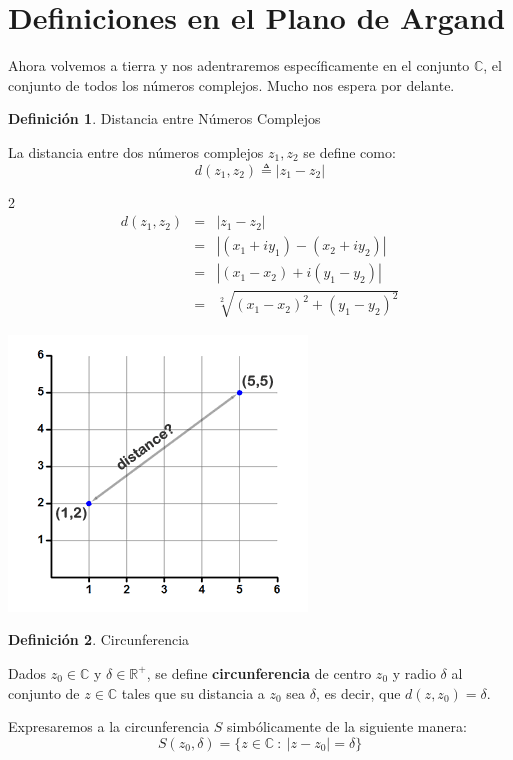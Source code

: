 \documentclass[12pt]{article}
\theoremstyle{definition}
\newtheorem{definition}{Definici\'on}[section]
\begin{document}
\section{Definiciones en el Plano de Argand}
Ahora volvemos a tierra y nos adentraremos espec\'ificamente en el conjunto $\mathbb{C}$, el conjunto de todos los n\'umeros complejos. Mucho nos espera por delante.\\

\colorbox{red!40!white!80}{\parbox{\linewidth}{
\theoremstyle{definition}
\begin{definition} Distancia entre N\'umeros Complejos

La distancia entre dos n\'umeros complejos $z_1, z_2$ se define como:
$$d(z_1, z_2) \triangleq |z_1 - z_2|$$
\end{definition}}}

\begin{multicols} {2}
\begin{eqnarray*}
d(z_1, z_2) &=& |z_1 - z_2|\\
&=& |(x_1 + iy_1) - (x_2+iy_2)|\\
&=& |(x_1-x_2) + i(y_1-y_2)|\\
&=& \sqrt[2]{(x_1-x_2)^2 + (y_1-y_2)^2}
\end{eqnarray*}
\linebreak

\includegraphics[scale=0.7]{distance.png}
\end{multicols}

\colorbox{red!40!white!80}{\parbox{\linewidth}{
\theoremstyle{definition}
\begin{definition} Circunferencia

Dados $z_0 \in \mathbb{C}$ y $\delta \in \mathbb{R}^+$, se define \textbf{circunferencia} de centro $z_0$ y radio $\delta$ al conjunto de $z \in \mathbb{C}$ tales que su distancia a $z_0$ sea $\delta$, es decir, que $d(z, z_0) = \delta$.

Expresaremos a la circunferencia $S$ simb\'olicamente de la siguiente manera:
$$ S(z_0, \delta) = \{ z \in \mathbb{C}\ :\ |z-z_0|=\delta \} $$
\end{definition}}}
\end{document}
